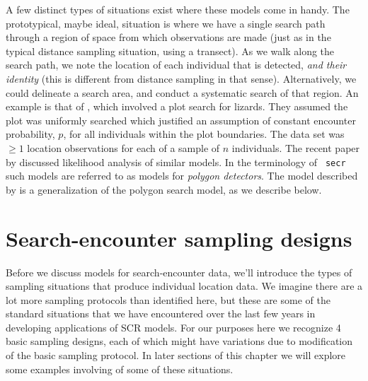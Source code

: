 A few distinct types of situations exist where these models come in
handy. The prototypical, maybe ideal, situation
\citet{royle_etal:2011mee} is where we have a single search path
through a region of space from which observations are made (just as in
the typical distance sampling situation, using a transect). As we walk
along the search path, we note the location of each individual that is
detected, {\it and their identity} (this is different from distance
sampling in that sense). 
Alternatively, we could delineate a search
area, and conduct a systematic search of that region. An example is
that of \citet{royle_young:2008}, which involved a plot search for
lizards. They assumed the plot was uniformly searched which justified
an assumption of constant encounter probability, $p$, for all individuals within the plot boundaries. 
The data set
was $\ge 1$ location observations for each of a sample of $n$
individuals.  The recent paper by \citet{efford:2011} discussed
likelihood analysis of similar models. In the terminology of \mbox{\tt
  secr} such models are referred to as models for {\it polygon
  detectors}.  The model described by \citep{royle_etal:2011mee} is a
generalization of the polygon search model, as we describe below.

\section{Search-encounter sampling designs}

Before we discuss models for search-encounter data, we'll
introduce the types of sampling situations that
produce individual location data.  We imagine there are a lot more sampling protocols
than identified here, but these are some of the standard situations that we have
encountered over the last few years in developing applications of SCR
models.  For our purposes here we recognize 4 basic sampling designs,
each of which might have variations due to modification of the basic
sampling protocol. In later sections of this chapter we will explore some
examples involving of some of these situations. 

